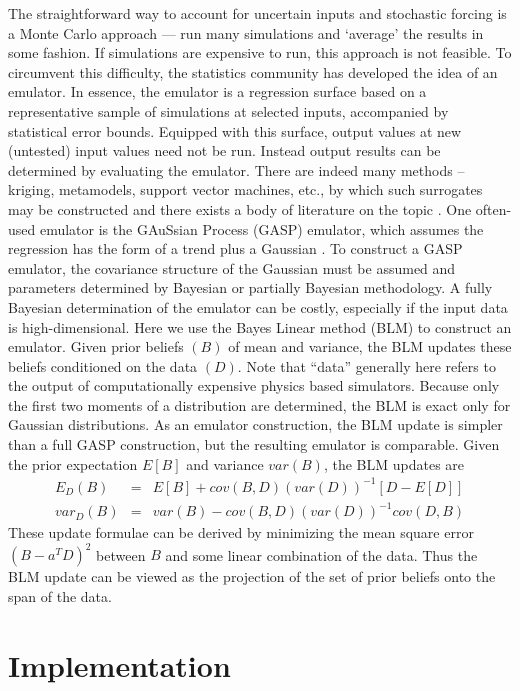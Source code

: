 \documentclass{article}
\begin{document}
The straightforward way to account for uncertain inputs and stochastic
forcing is a Monte Carlo approach --- run many simulations and
`average' the results in some fashion. If simulations are expensive to
run, this approach is not feasible. To circumvent this difficulty, the
statistics community has developed the idea of an emulator.  In
essence, the emulator is a regression surface based on a
representative sample of simulations at selected inputs, accompanied
by statistical error bounds. Equipped with this surface, output values
at new (untested) input values need not be run.  Instead output
results can be determined by evaluating the emulator. There are indeed
many methods -- kriging, metamodels, support vector machines, etc., by
which such surrogates may be constructed and there exists a body of
literature on the topic \citep{simpson1,simpson2}.  One often-used
emulator is the GAuSsian Process (GASP) emulator, which assumes the
regression has the form of a trend plus a Gaussian
\citep{kennedy2001bcc, ContiOHagan, ohagan2006bac, bayarriusc}.  To
construct a GASP emulator, the covariance structure of the Gaussian
must be assumed and parameters determined by Bayesian or partially
Bayesian methodology.  A fully Bayesian determination of the emulator
can be costly, especially if the input data is high-dimensional.  Here
we use the Bayes Linear method (BLM) \citep{blm1tutor} to construct an
emulator. Given prior beliefs $(B)$ of mean and variance, the BLM
updates these beliefs conditioned on the data $(D)$.  Note that
``data'' generally here refers to the output of computationally
expensive physics based simulators.  Because only the first two
moments of a distribution are determined, the BLM is exact only for
Gaussian distributions.  As an emulator construction, the BLM update
is simpler than a full GASP construction, but the resulting emulator
is comparable.  Given the prior expectation $E[B]$ and variance
$var(B)$, the BLM updates are
\begin{eqnarray} \label{blupdate}
E_D(B) &=& E[B] + cov(B,D) (var(D))^{-1} [D-E[D]] \\ \nonumber
var_D(B) &=& var(B) - cov(B,D) (var(D))^{-1} cov(D,B)
\end{eqnarray}
These update formulae can be derived by minimizing the mean square
error $(B - a^T D)^2$ between $B$ and some linear combination of the
data. Thus the BLM update can be viewed as the projection of the set
of prior beliefs onto the span of the data.

\section{Implementation}
\end{document}
